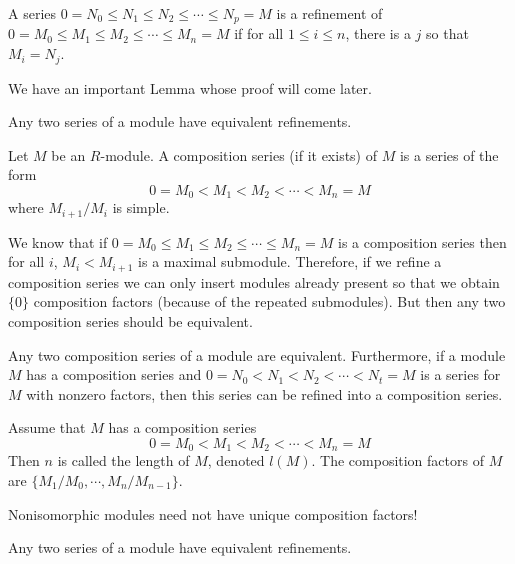 \begin{dfn}[Refinement]
A series $0=N_0\leq N_1 \leq N_2 \leq \cdots \leq N_p=M$ is a refinement of $0=M_0 \leq M_1 \leq M_2 \leq \cdots \leq M_n=M$ if for all $1\leq i \leq n$, there is a $j$ so that $M_i=N_j$.
\end{dfn}

We have an important Lemma whose proof will come later.

\begin{thm}
Any two series of a module have equivalent refinements.
\end{thm}

\begin{dfn}
Let $M$ be an $R$-module. A composition series (if it exists) of $M$ is a series of the form
\[
0=M_0 < M_1 < M_2 < \cdots < M_n=M
\]
where $M_{i+1}/M_i$ is simple. 
\end{dfn}

\begin{rem}
We know that if $0=M_0 \leq M_1 \leq M_2 \leq \cdots \leq M_n=M$ is a composition series then for all $i$, $M_i < M_{i+1}$ is a maximal submodule. Therefore, if we refine a composition series we can only insert modules already present so that we obtain $\{0\}$ composition factors (because of the repeated submodules). But then any two composition series should be equivalent.  
\end{rem}

\begin{thm}
Any two composition series of a module are equivalent. Furthermore, if a module $M$ has a composition series and $0=N_0 < N_1 < N_2 < \cdots < N_t=M$ is a series for $M$ with nonzero factors, then this series can be refined into a composition series. 
\end{thm}

\begin{dfn}
Assume that $M$ has a composition series
\[
0=M_0 < M_1 < M_2 < \cdots < M_n=M
\]
Then $n$ is called the length of $M$, denoted $l(M)$. The composition factors of $M$ are $\{M_1/M_0,\cdots,M_n/M_{n-1}\}$.
\end{dfn}

\begin{rem}
Nonisomorphic modules need not have unique composition factors! 
\end{rem}

\begin{thm}
Any two series of a module have equivalent refinements.
\end{thm}


